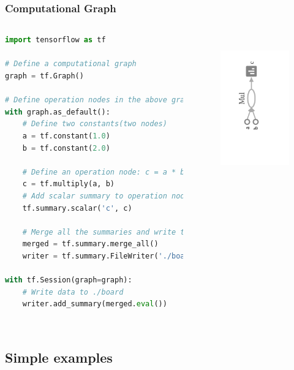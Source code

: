 \begin{frame}[fragile]
  \MyLogo
  \frametitle{Computational Graph}  
%  
\begin{columns}
\tiny{
\begin{lstlisting}[language=python]
import tensorflow as tf

# Define a computational graph
graph = tf.Graph()

# Define operation nodes in the above graph
with graph.as_default():
	# Define two constants(two nodes)
	a = tf.constant(1.0)
	b = tf.constant(2.0)

	# Define an operation node: c = a * b
	c = tf.multiply(a, b)
	# Add scalar summary to operation node
	tf.summary.scalar('c', c)
	
	# Merge all the summaries and write to ./board
	merged = tf.summary.merge_all()
	writer = tf.summary.FileWriter('./board', graph)

with tf.Session(graph=graph):
	# Write data to ./board
	writer.add_summary(merged.eval())
	
\end{lstlisting}
}
%
\begin{figure}[htbp] 
   \includegraphics[height=2.5in]{figures/compgraph.png} 
\end{figure}
%
\end{columns}
\end{frame}

\subsection{Simple examples}

